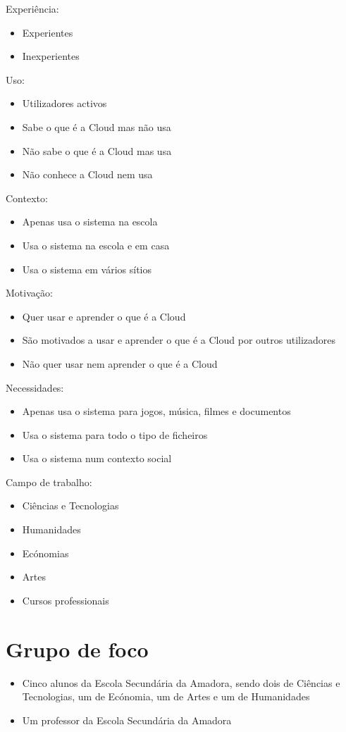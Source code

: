 Experiência:
\begin{itemize}
	\item Experientes
	\item Inexperientes
\end{itemize}
Uso:
\begin{itemize}
	\item Utilizadores activos
	\item Sabe o que é a Cloud mas não usa
	\item Não sabe o que é a Cloud mas usa
	\item Não conhece a Cloud nem usa
\end{itemize}
Contexto:
\begin{itemize}
	\item Apenas usa o sistema na escola
	\item Usa o sistema na escola e em casa
	\item Usa o sistema em vários sítios
\end{itemize}
Motivação:
\begin{itemize}
	\item Quer usar e aprender o que é a Cloud
	\item São motivados a usar e aprender o que é a Cloud por outros utilizadores
	\item Não quer usar nem aprender o que é a Cloud
\end{itemize}
Necessidades:
\begin{itemize}
	\item Apenas usa o sistema para jogos, música, filmes e documentos
	\item Usa o sistema para todo o tipo de ficheiros
	\item Usa o sistema num contexto social
\end{itemize}
Campo de trabalho:
\begin{itemize}
	\item Ciências e Tecnologias
	\item Humanidades
	\item Ecónomias
	\item Artes
	\item Cursos professionais
\end{itemize}

\section{Grupo de foco}
\begin{itemize}
	\item Cinco alunos da Escola Secundária da Amadora, sendo dois de Ciências e Tecnologias, um de Ecónomia, um de Artes e um de Humanidades
	\item Um professor da Escola Secundária da Amadora
\end{itemize}
